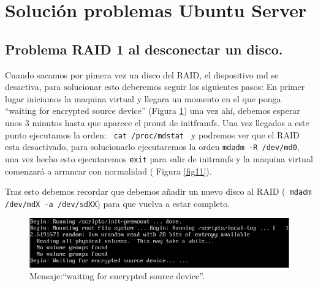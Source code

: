 \clearpage
\addappheadtotoc
\appendixpage

\appendix


\section{Solución problemas Ubuntu Server }
\subsection{Problema RAID 1 al desconectar un disco.}
Cuando sacamos por pimera vez un disco del RAID, el dispositivo md se desactiva, para solucionar esto deberemos seguir los siguientes pasos:
En primer lugar iniciamos la maquina virtual y llegara un momento en el que ponga ``waiting for encrypted source device'' (Figura \ref{fig10}) una vez ahí, debemos esperar unos 3 minutos hasta que aparece el promt de initframfs.
Una vez llegados a este punto ejecutamos la orden: \texttt{ cat /proc/mdstat } y podremos ver que el RAID esta desactivado, para solucionarlo ejecutaremos la orden \texttt{mdadm -R /dev/md0}, una vez hecho esto ejecutaremos \texttt{exit} para salir de initramfs y la maquina virtual comenzará a arrancar con normalidad ( Figura \ref{fig11}). \cite{manmdadm}

Tras esto debemos recordar que debemos añadir un nuevo disco al RAID (\texttt{ mdadm /dev/mdX -a /dev/sdXX}) para que vuelva a estar completo.

\begin{figure}[H]
    \begin{center}
        \includegraphics[scale=0.6]{Imagenes/waiting}
        \caption{Mensaje:``waiting for encrypted source device''.}
        \label{fig10}
    \end{center}
\end{figure}

